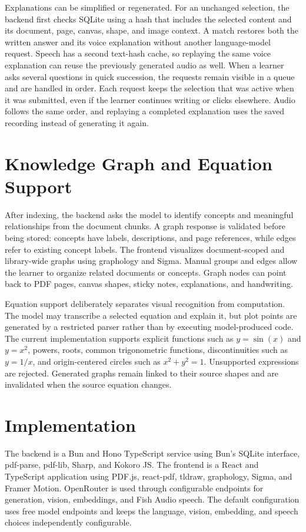 \documentclass[conference]{IEEEtran}
\begin{document}
Explanations can be simplified or regenerated. For an unchanged selection, the backend first checks SQLite using a hash that includes the selected content and its document, page, canvas, shape, and image context. A match restores both the written answer and its voice explanation without another language-model request. Speech has a second text-hash cache, so replaying the same voice explanation can reuse the previously generated audio as well. When a learner asks several questions in quick succession, the requests remain visible in a queue and are handled in order. Each request keeps the selection that was active when it was submitted, even if the learner continues writing or clicks elsewhere. Audio follows the same order, and replaying a completed explanation uses the saved recording instead of generating it again.

\section{Knowledge Graph and Equation Support}
After indexing, the backend asks the model to identify concepts and meaningful relationships from the document chunks. A graph response is validated before being stored: concepts have labels, descriptions, and page references, while edges refer to existing concept labels. The frontend visualizes document-scoped and library-wide graphs using graphology and Sigma. Manual groups and edges allow the learner to organize related documents or concepts. Graph nodes can point back to PDF pages, canvas shapes, sticky notes, explanations, and handwriting.

Equation support deliberately separates visual recognition from computation. The model may transcribe a selected equation and explain it, but plot points are generated by a restricted parser rather than by executing model-produced code. The current implementation supports explicit functions such as $y=\sin(x)$ and $y=x^2$, powers, roots, common trigonometric functions, discontinuities such as $y=1/x$, and origin-centered circles such as $x^2+y^2=1$. Unsupported expressions are rejected. Generated graphs remain linked to their source shapes and are invalidated when the source equation changes.

\section{Implementation}
The backend is a Bun and Hono TypeScript service using Bun's SQLite interface, pdf-parse, pdf-lib, Sharp, and Kokoro JS. The frontend is a React and TypeScript application using PDF.js, react-pdf, tldraw, graphology, Sigma, and Framer Motion. OpenRouter is used through configurable endpoints for generation, vision, embeddings, and Fish Audio speech. The default configuration uses free model endpoints and keeps the language, vision, embedding, and speech choices independently configurable.
\end{document}
